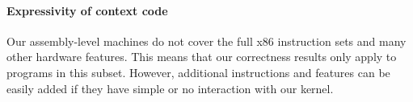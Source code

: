 
\paragraph{Expressivity of context code} 
Our assembly-level machines do not cover the full x86 instruction sets 
and many other hardware features. This means that our correctness results 
only apply to programs in this subset. However, additional instructions 
and features can be easily added if they have simple or no interaction
with our kernel. 

